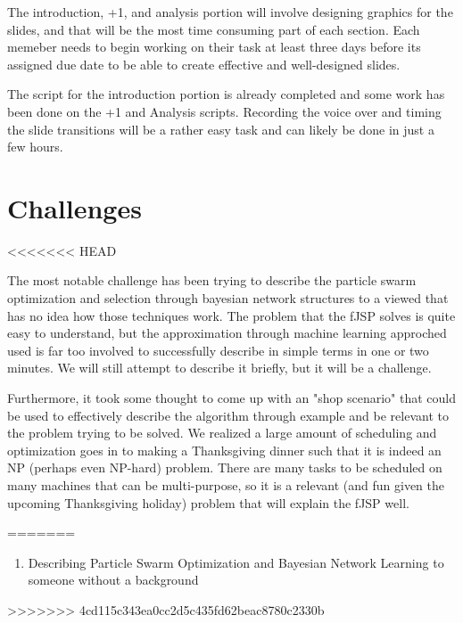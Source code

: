 \documentclass[11pt,twocolumn]{article}
\begin{document}
	The introduction, +1, and analysis portion will involve designing graphics for the slides, and that will be the most time consuming part of each section.  Each memeber needs to begin working on their task at least three days before its assigned due date to be able to create effective and well-designed slides.
	
	The script for the introduction portion is already completed and some work has been done on the +1 and Analysis scripts.  Recording the voice over and timing the slide transitions will be a rather easy task and can likely be done in just a few hours.
	
	\section{Challenges}
<<<<<<< HEAD
	
	The most notable challenge has been trying to describe the particle swarm optimization and selection through bayesian network structures to a viewed that has no idea how those techniques work.  The problem that the fJSP solves is quite easy to understand, but the approximation through machine learning approched used is far too involved to successfully describe in simple terms in one or two minutes.  We will still attempt to describe it briefly, but it will be a challenge.
	
	Furthermore, it took some thought to come up with an "shop scenario" that could be used to effectively describe the algorithm through example and be relevant to the problem trying to be solved.  We realized a large amount of scheduling and optimization goes in to making a Thanksgiving dinner such that it is indeed an NP (perhaps even NP-hard) problem.  There are many tasks to be scheduled on many machines that can be multi-purpose, so it is a relevant (and fun given the upcoming Thanksgiving holiday) problem that will explain the fJSP well.
	
=======
	\begin{enumerate}
		\item Describing Particle Swarm Optimization and Bayesian Network Learning to someone without a background 
	\end{enumerate}
>>>>>>> 4cd115c343ea0cc2d5c435fd62beac8780c2330b
\end{document}
